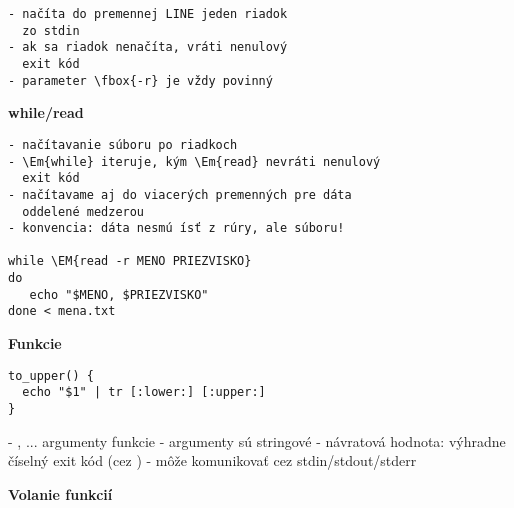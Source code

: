 \documentclass[8pt,landscape]{extarticle}
\newcommand{\Heading}[1]{%
{\begin{center}\bfseries\Large#1\end{center}}%
}%
\newcommand{\Em}[1]{\Ovalbox{\ttfamily #1}}
\newcommand{\EM}[1]{\fbox{#1}}
\newenvironment{karticka}[1]%
{%
\Heading{#1}%
}%
{%
\clearpage
}%
\begin{document}
%
\begin{Verbatim}[commandchars=\\\{\}]
- načíta do premennej LINE jeden riadok 
  zo stdin
- ak sa riadok nenačíta, vráti nenulový
  exit kód
- parameter \fbox{-r} je vždy povinný
\end{Verbatim}
\newpage
\Heading{while/read}
\begin{Verbatim}[commandchars=\\\{\}]
- načítavanie súboru po riadkoch
- \Em{while} iteruje, kým \Em{read} nevráti nenulový 
  exit kód
- načítavame aj do viacerých premenných pre dáta
  oddelené medzerou
- konvencia: dáta nesmú ísť z rúry, ale súboru!

while \EM{read -r MENO PRIEZVISKO}
do
   echo "$MENO, $PRIEZVISKO"
done < mena.txt
\end{Verbatim}
\begin{karticka}{Funkcie}
\begin{Verbatim}
to_upper() {
  echo "$1" | tr [:lower:] [:upper:]
}
\end{Verbatim}
\begin{obsah}
- \Em{$1}, \Em{$2}... argumenty funkcie
- argumenty sú stringové
- návratová hodnota: výhradne číselný exit kód 
  (cez \Em{return})
- môže komunikovať cez stdin/stdout/stderr
\end{obsah}
\end{karticka}

\begin{karticka}{Volanie funkcií}
\end{karticka}
\end{document}
